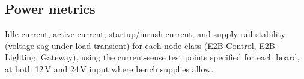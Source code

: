 \subsection{Power metrics}

Idle current, active current, startup/inrush current, and supply-rail stability (voltage sag under load transient) for each node class (E2B-Control, E2B-Lighting, Gateway), using the current-sense test points specified for each board, at both 12\,V and 24\,V input where bench supplies allow.
